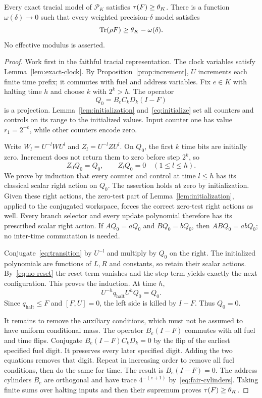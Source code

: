 \begin{theorem}\label{thm:flag}
Every exact tracial model of $\mathcal P_K$ satisfies $\tau(F)\ge\theta_K$. There is a function $\omega(\delta)\to0$ such that every weighted precision-$\delta$ model satisfies
\begin{equation}\label{eq:flag-density}
 \operatorname{Tr}(\rho F)\ge\theta_K-\omega(\delta).
\end{equation}
No effective modulus is asserted.
\end{theorem}
\begin{proof}
Work first in the faithful tracial representation. The clock variables satisfy Lemma~\ref{lem:exact-clock}. By Proposition~\ref{prop:increment}, $U$ increments each finite time prefix; it commutes with fuel and address variables. Fix $e\in K$ with halting time $h$ and choose $k$ with $2^k>h$. The operator
\[
 Q_0=B_eC_kD_k(I-F)
\]
is a projection. Lemma~\ref{lem:initialization} and~\eqref{eq:initialize} set all counters and controls on its range to the initialized values. Input counter one has value $r_1=2^{-e}$, while other counters encode zero.

Write $W_l=U^{-l}WU^l$ and $Z_l=U^{-l}ZU^l$. On $Q_0$, the first $k$ time bits are initially zero. Increment does not return them to zero before step $2^k$, so
\begin{equation}\label{eq:no-reset}
 Z_0Q_0=Q_0,\qquad Z_lQ_0=0\quad(1\le l\le h).
\end{equation}
We prove by induction that every counter and control at time $l\le h$ has its classical scalar right action on $Q_0$. The assertion holds at zero by initialization. Given these right actions, the zero-test part of Lemma~\ref{lem:initialization}, applied to the conjugated workspace, forces the correct zero-test right actions as well. Every branch selector and every update polynomial therefore has its prescribed scalar right action. If $AQ_0=aQ_0$ and $BQ_0=bQ_0$, then $ABQ_0=abQ_0$; no inter-time commutation is needed.

Conjugate~\eqref{eq:transition} by $U^{-l}$ and multiply by $Q_0$ on the right. The initialized polynomials are functions of $L,R$ and constants, so retain their scalar actions. By~\eqref{eq:no-reset} the reset term vanishes and the step term yields exactly the next configuration. This proves the induction. At time $h$,
\[
 U^{-h}q_{\mathrm{halt}}U^hQ_0=Q_0.
\]
Since $q_{\mathrm{halt}}\le F$ and $[F,U]=0$, the left side is killed by $I-F$. Thus $Q_0=0$.

It remains to remove the auxiliary conditions, which must not be assumed to have uniform conditional mass. The operator $B_e(I-F)$ commutes with all fuel and time flips. Conjugate $B_e(I-F)C_kD_k=0$ by the flip of the earliest specified fuel digit. It preserves every later specified digit. Adding the two equations removes that digit. Repeat in increasing order to remove all fuel conditions, then do the same for time. The result is $B_e(I-F)=0$. The address cylinders $B_e$ are orthogonal and have trace $4^{-(e+1)}$ by~\eqref{eq:fair-cylinders}. Taking finite sums over halting inputs and then their supremum proves $\tau(F)\ge\theta_K$.


\end{proof}
